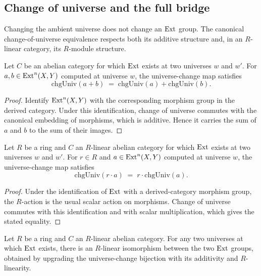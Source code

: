 \subsection{Change of universe and the full bridge}

Changing the ambient universe does not change an \(\operatorname{Ext}\) group. The canonical change-of-universe equivalence respects both its additive structure and, in an \(R\)-linear category, its \(R\)-module structure.

\begin{lemma}\leanok
  \label{lem:Abelian_Ext_chgUniv_add}
  Let \(C\) be an abelian category for which \(\operatorname{Ext}\) exists at two universes \(w\) and \(w'\). For \(a, b \in \operatorname{Ext}^{n}(X, Y)\) computed at universe \(w\), the universe-change map satisfies
  \[
    \mathrm{chgUniv}(a + b) \;=\; \mathrm{chgUniv}(a) + \mathrm{chgUniv}(b).
  \]
\end{lemma}

\begin{proof}

\leanok
  Identify \(\operatorname{Ext}^n(X,Y)\) with the corresponding morphism group in the derived category. Under this identification, change of universe commutes with the canonical embedding of morphisms, which is additive. Hence it carries the sum of \(a\) and \(b\) to the sum of their images.
\end{proof}

\begin{lemma}\leanok
  \label{lem:Abelian_Ext_chgUniv_smul}
  Let \(R\) be a ring and \(C\) an \(R\)-linear abelian category for which \(\operatorname{Ext}\) exists at two universes \(w\) and \(w'\). For \(r \in R\) and \(a \in \operatorname{Ext}^{n}(X, Y)\) computed at universe \(w\), the universe-change map satisfies
  \[
    \mathrm{chgUniv}(r \cdot a) \;=\; r \cdot \mathrm{chgUniv}(a).
  \]
\end{lemma}

\begin{proof}

\leanok
  Under the identification of \(\operatorname{Ext}\) with a derived-category morphism group, the \(R\)-action is the usual scalar action on morphisms. Change of universe commutes with this identification and with scalar multiplication, which gives the stated equality.
\end{proof}

\begin{definition}\leanok
  \label{def:Abelian_Ext_chgUnivLinearEquiv}
  Let \(R\) be a ring and \(C\) an \(R\)-linear abelian category. For any two universes at which \(\operatorname{Ext}\) exists, there is an \(R\)-linear isomorphism between the two \(\operatorname{Ext}\) groups, obtained by upgrading the universe-change bijection with its additivity and \(R\)-linearity.
\end{definition}

